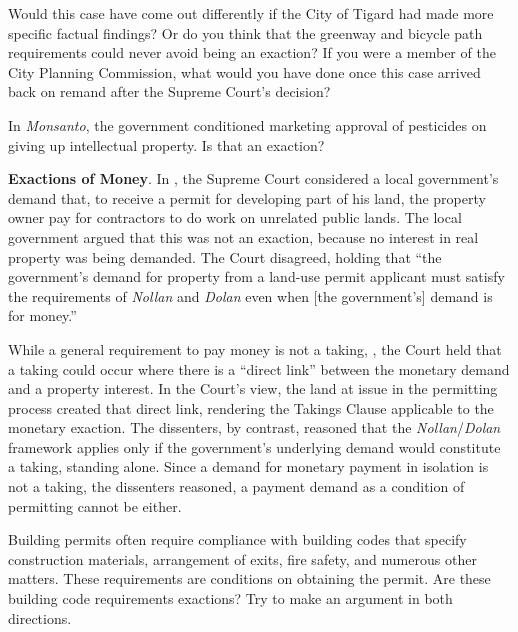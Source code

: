 
\item Would this case have come out differently if the City of Tigard had made
more specific factual findings? Or do you think that the greenway and bicycle
path requirements could never avoid being an exaction? If you were a member of
the City Planning Commission, what would you have done once this case arrived
back on remand after the Supreme Court's decision?



\item In \emph{Monsanto}, the government conditioned marketing approval of
pesticides on giving up intellectual property. Is that an exaction?

\item \textbf{Exactions of Money}. In \optclause, the
Supreme Court considered a local government's demand that, to receive a permit
for developing part of his land, the property owner pay for contractors to do
work on unrelated public lands. The local government argued that this was not an
exaction, because no interest in real property was being demanded. The Court
disagreed, holding that ``the government's demand for property from a land-use
permit applicant must satisfy the requirements of \emph{Nollan} and \emph{Dolan}
even when [the government's] demand is for money.''

While a general requirement to pay money is not a taking, , the  Court held that a taking could
occur where
there is a ``direct link'' between the monetary demand and a property interest.
In the Court's view, the land at issue in the permitting process created that
direct link, rendering the Takings Clause applicable to the monetary exaction.
The dissenters, by contrast, reasoned that the \emph{Nollan}/\emph{Dolan}
framework applies only if the government's underlying demand would constitute a
taking, standing alone. Since a demand for monetary payment in isolation is not
a taking, the dissenters reasoned, a payment demand as a condition of permitting
cannot be either.

\item Building permits often require compliance with building codes that specify
construction materials, arrangement of exits, fire safety, and numerous other
matters. These requirements are conditions on obtaining the permit. Are these
building code requirements exactions? Try to make an argument in both
directions.

